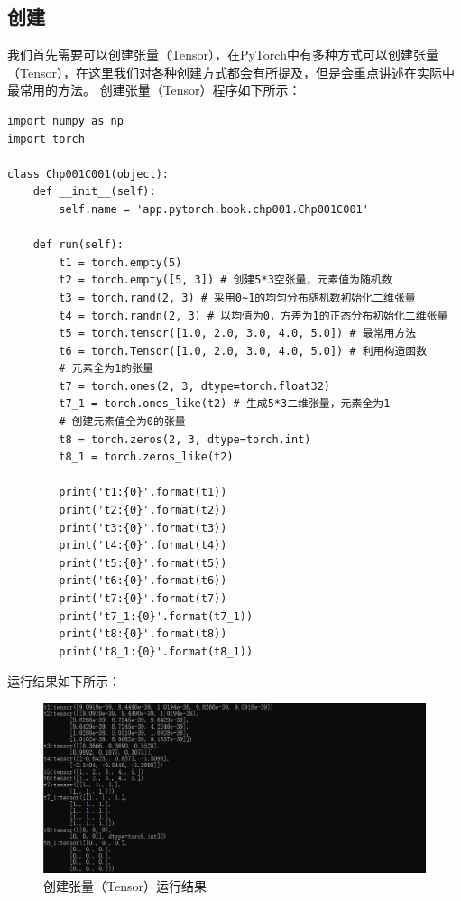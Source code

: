 \documentclass[UTF8]{article}
\begin{document}
\subsection{创建}
我们首先需要可以创建张量（Tensor），在PyTorch中有多种方式可以创建张量（Tensor），在这里我们对各种创建方式都会有所提及，但是会重点讲述在实际中最常用的方法。
创建张量（Tensor）程序如下所示：
\begin{lstlisting}
import numpy as np
import torch

class Chp001C001(object):
    def __init__(self):
        self.name = 'app.pytorch.book.chp001.Chp001C001'

    def run(self):
        t1 = torch.empty(5)
        t2 = torch.empty([5, 3]) # 创建5*3空张量，元素值为随机数
        t3 = torch.rand(2, 3) # 采用0~1的均匀分布随机数初始化二维张量
        t4 = torch.randn(2, 3) # 以均值为0，方差为1的正态分布初始化二维张量
        t5 = torch.tensor([1.0, 2.0, 3.0, 4.0, 5.0]) # 最常用方法
        t6 = torch.Tensor([1.0, 2.0, 3.0, 4.0, 5.0]) # 利用构造函数
        # 元素全为1的张量
        t7 = torch.ones(2, 3, dtype=torch.float32) 
        t7_1 = torch.ones_like(t2) # 生成5*3二维张量，元素全为1
        # 创建元素值全为0的张量
        t8 = torch.zeros(2, 3, dtype=torch.int)
        t8_1 = torch.zeros_like(t2)

        print('t1:{0}'.format(t1))
        print('t2:{0}'.format(t2))
        print('t3:{0}'.format(t3))
        print('t4:{0}'.format(t4))
        print('t5:{0}'.format(t5))
        print('t6:{0}'.format(t6))
        print('t7:{0}'.format(t7))
        print('t7_1:{0}'.format(t7_1))
        print('t8:{0}'.format(t8))
        print('t8_1:{0}'.format(t8_1))
\end{lstlisting}
运行结果如下所示：
\begin{figure}[H]
	\caption{创建张量（Tensor）运行结果}
	\label{f000001}
	\centering
	\includegraphics[width=15cm]{images/f000001}
\end{figure}
\end{document}
